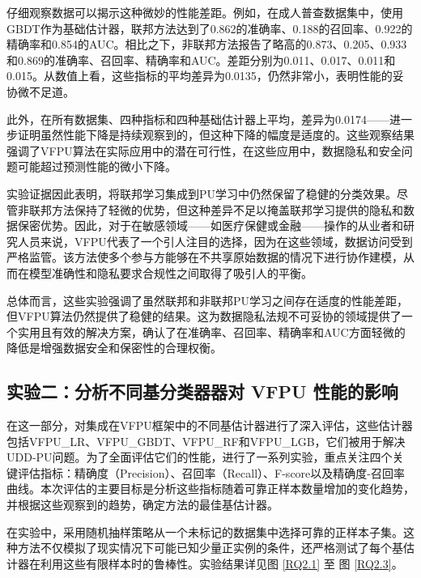 \vspace{-0.35cm}
仔细观察数据可以揭示这种微妙的性能差距。例如，在成人普查数据集中，使用GBDT作为基础估计器，联邦方法达到了0.862的准确率、0.188的召回率、0.922的精确率和0.854的AUC。相比之下，非联邦方法报告了略高的0.873、0.205、0.933和0.869的准确率、召回率、精确率和AUC。差距分别为0.011、0.017、0.011和0.015。从数值上看，这些指标的平均差异为0.0135，仍然非常小，表明性能的妥协微不足道。

此外，在所有数据集、四种指标和四种基础估计器上平均，差异为0.0174——进一步证明虽然性能下降是持续观察到的，但这种下降的幅度是适度的。这些观察结果强调了VFPU算法在实际应用中的潜在可行性，在这些应用中，数据隐私和安全问题可能超过预测性能的微小下降。

实验证据因此表明，将联邦学习集成到PU学习中仍然保留了稳健的分类效果。尽管非联邦方法保持了轻微的优势，但这种差异不足以掩盖联邦学习提供的隐私和数据保密优势。因此，对于在敏感领域——如医疗保健或金融——操作的从业者和研究人员来说，VFPU代表了一个引人注目的选择，因为在这些领域，数据访问受到严格监管。该方法使多个参与方能够在不共享原始数据的情况下进行协作建模，从而在模型准确性和隐私要求合规性之间取得了吸引人的平衡。

总体而言，这些实验强调了虽然联邦和非联邦PU学习之间存在适度的性能差距，但VFPU算法仍然提供了稳健的结果。这为数据隐私法规不可妥协的领域提供了一个实用且有效的解决方案，确认了在准确率、召回率、精确率和AUC方面轻微的降低是增强数据安全和保密性的合理权衡。

\subsection{实验二：分析不同基分类器器对 VFPU 性能的影响}

在这一部分，对集成在VFPU框架中的不同基估计器进行了深入评估，这些估计器包括VFPU\_LR、VFPU\_GBDT、VFPU\_RF和VFPU\_LGB，它们被用于解决UDD-PU问题。为了全面评估它们的性能，进行了一系列实验，重点关注四个关键评估指标：精确度（Precision）、召回率（Recall）、F-score以及精确度-召回率曲线。本次评估的主要目标是分析这些指标随着可靠正样本数量增加的变化趋势，并根据这些观察到的趋势，确定方法的最佳基估计器。

在实验中，采用随机抽样策略从一个未标记的数据集中选择可靠的正样本子集。这种方法不仅模拟了现实情况下可能已知少量正实例的条件，还严格测试了每个基估计器在利用这些有限样本时的鲁棒性。实验结果详见图 \ref{RQ2.1} 至 图 \ref{RQ2.3}。

